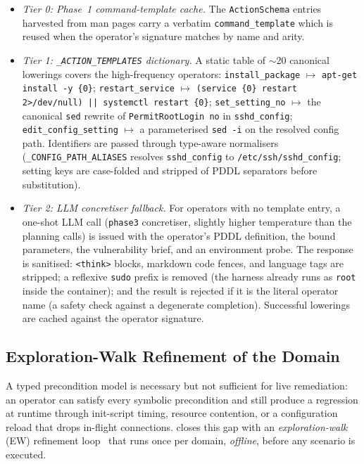 \begin{itemize}
  \item \emph{Tier 0: Phase~1 command-template cache.} The \texttt{ActionSchema} entries harvested from man pages carry a verbatim \texttt{command\_template} which is reused when the operator's signature matches by name and arity.
  \item \emph{Tier 1: \texttt{\_ACTION\_TEMPLATES} dictionary.} A static table of $\sim$20 canonical lowerings covers the high-frequency operators: \texttt{install\_package} $\mapsto$ \texttt{apt-get install -y \{0\}}; \texttt{restart\_service} $\mapsto$ \texttt{(service \{0\} restart 2>/dev/null) || systemctl restart \{0\}}; \texttt{set\_setting\_no} $\mapsto$ the canonical \texttt{sed} rewrite of \texttt{PermitRootLogin no} in \texttt{sshd\_config}; \texttt{edit\_config\_setting} $\mapsto$ a parameterised \texttt{sed -i} on the resolved config path. Identifiers are passed through type-aware normalisers (\texttt{\_CONFIG\_PATH\_ALIASES} resolves \texttt{sshd\_config} to \texttt{/etc/ssh/sshd\_config}; setting keys are case-folded and stripped of PDDL separators before substitution).
  \item \emph{Tier 2: LLM concretiser fallback.} For operators with no template entry, a one-shot LLM call (\texttt{phase3} concretiser, slightly higher temperature than the planning calls) is issued with the operator's PDDL definition, the bound parameters, the vulnerability brief, and an environment probe. The response is sanitised: \texttt{<think>} blocks, markdown code fences, and language tags are stripped; a reflexive \texttt{sudo} prefix is removed (the harness already runs as \texttt{root} inside the container); and the result is rejected if it is the literal operator name (a safety check against a degenerate completion). Successful lowerings are cached against the operator signature.
\end{itemize}

\subsection{Exploration-Walk Refinement of the Domain}
\label{app:ew}

A typed precondition model is necessary but not sufficient for live remediation: an operator can satisfy every symbolic precondition and still produce a regression at runtime through init-script timing, resource contention, or a configuration reload that drops in-flight connections. \nsplan closes this gap with an \emph{exploration-walk} (EW) refinement loop~\cite{ewpaper} that runs once per domain, \emph{offline}, before any scenario is executed.

